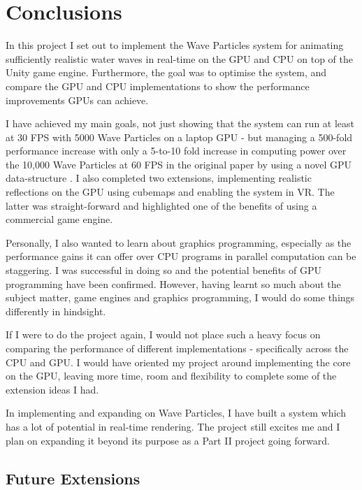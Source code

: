 \documentclass[12pt,a4paper,twoside]{report}
\begin{document}
\chapter{Conclusions}


In this project I set out to implement the Wave Particles system for animating
sufficiently realistic water waves in real-time on the GPU and CPU on top of
the Unity game engine. Furthermore, the goal was to optimise the system, and
compare the GPU and CPU implementations to show the performance improvements
GPUs can achieve.

I have achieved my main goals, not just showing that the system can run at
least at 30 FPS with 5000 Wave Particles on a laptop GPU - but managing a
500-fold performance increase with only a 5-to-10 fold increase in computing
power over the 10,000 Wave Particles at 60 FPS in the original paper by using a
novel GPU data-structure \cite{Yuksel2007}. I also completed two extensions,
implementing realistic reflections on the GPU using cubemaps and enabling the
system in VR. The latter was straight-forward and highlighted one of the
benefits of using a commercial game engine.

Personally, I also wanted to learn about graphics programming, especially as
the performance gains it can offer over CPU programs in parallel computation can
be staggering. I was successful in doing so and the potential benefits of GPU
programming have been confirmed. However, having learnt so much about the
subject matter, game engines and graphics programming, I would do some things
differently in hindsight.

If I were to do the project again, I would not place such a heavy focus on
comparing the performance of different implementations - specifically across
the CPU and GPU. I would have oriented my project around implementing the core
on the GPU, leaving more time, room and flexibility to complete some of the
extension ideas I had.


In implementing and expanding on Wave Particles, I have built a system which
has a lot of potential in real-time rendering. The project still excites me and
I plan on expanding it beyond its purpose as a Part II project going forward.

\section{Future Extensions}
\label{sec:future_extensions}
\end{document}
